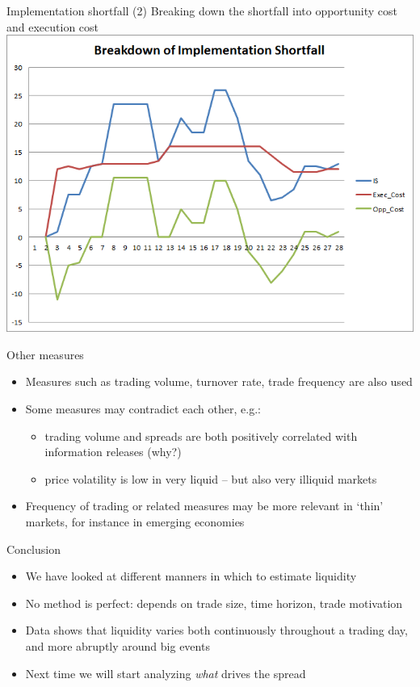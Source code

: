 \documentclass[english,10pt
,aspectratio=169
]{beamer}
\begin{document}
\begin{frame}{Implementation shortfall (2)}
	Breaking down the shortfall into opportunity cost and execution cost
	\center
	\includegraphics[scale=0.39]{pics/L2_is2}
\end{frame}


\begin{frame}{Other measures}
\begin{itemize}
	\item Measures such as trading volume, turnover rate, trade frequency are also used
	\item Some measures may contradict each other, e.g.:
	\begin{itemize}
		\item trading volume and spreads are both positively correlated with information releases (why?)
		\item price volatility is low in very liquid -- but also very illiquid markets
	\end{itemize}
	\item Frequency of trading or related measures may be more relevant in `thin' markets, for instance in emerging economies
\end{itemize}
\end{frame}


\begin{frame}{Conclusion}
	\begin{itemize}
		\item We have looked at different manners in which to estimate liquidity
		\item No method is perfect: depends on trade size, time horizon, trade motivation
		\item Data shows that liquidity varies both continuously throughout a trading day, and more abruptly around big events
		\item Next time we will start analyzing \textit{what} drives the spread
	\end{itemize}
\end{frame}
\end{document}
